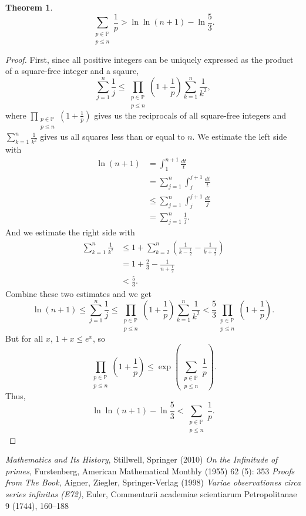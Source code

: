 \documentclass[a4paper]{article}
\newtheorem{theorem}{Theorem}[section]
\theoremstyle{definition}
\theoremstyle{remark}
\begin{document}
\begin{theorem}
  \[
  \sum_{\substack{p\in\mathbb{P}\\p\le n}}\frac{1}{p}>\ln\ln(n+1)-\ln\frac{5}{3}
  .
  \]
  \label{thm:sumReciprocalPrimeLnLn}
\end{theorem}
\begin{proof}
  First, since all positive integers can be uniquely expressed as the product of a square-free integer and a sqaure,
  \[
  \sum_{j=1}^n\frac{1}{j}\le\prod_{\substack{p\in\mathbb{P}\\p\le n}}\left( 1+\frac{1}{p} \right)\sum_{k=1}^n\frac{1}{k^2}
  ,
  \]
  where $\displaystyle\prod_{\substack{p\in\mathbb{P}\\p\le n}}\left( 1+\frac{1}{p} \right)$ gives us the reciprocals of all square-free integers and $\displaystyle\sum_{k=1}^n\frac{1}{k^2}$ gives us all squares less than or equal to $n$.
  We estimate the left side with
  \begin{align*}
    \ln(n+1)&=\int_1^{n+1}\frac{dt}{t}\\
    &=\sum_{j=1}^n\int_j^{j+1}\frac{dt}{t}\\
    &\le\sum_{j=1}^n\int_j^{j+1}\frac{dt}{j}\\
    &=\sum_{j=1}^n\frac{1}{j}
    .
  \end{align*}
  And we estimate the right side with
  \begin{align*}
    \sum_{k=1}^n\frac{1}{k^2}&\le1+\sum_{k=2}^n\left( \frac{1}{k-\frac{1}{2}}-\frac{1}{k+\frac{1}{2}} \right)\\
    &=1+\frac{2}{3}-\frac{1}{n+\frac{1}{2}}\\
    &<\frac{5}{3}
    .
  \end{align*}
  Combine these two estimates and we get
  \[
  \ln(n+1)\le\sum_{j=1}^n\frac{1}{j}\le\prod_{\substack{p\in\mathbb{P}\\p\le n}}\left( 1+\frac{1}{p} \right)\sum_{k=1}^n\frac{1}{k^2}<\frac{5}{3}\prod_{\substack{p\in\mathbb{P}\\p\le n}}\left( 1+\frac{1}{p} \right)
  .
  \]
  But for all $x$, $1+x\le e^{x}$, so
  \[
  \prod_{\substack{p\in\mathbb{P}\\p\le n}}\left( 1+\frac{1}{p} \right)\le \exp\left( \sum_{\substack{p\in\mathbb{P}\\p\le n}}\frac{1}{p} \right)
  .
  \]
  Thus, 
  \[
  \ln\ln(n+1)-\ln\frac{5}{3}<\sum_{\substack{p\in\mathbb{P}\\p\le n}}\frac{1}{p}
  .
  \]
\end{proof}

\begin{thebibliography}{12}
    \textit{Mathematics and Its History}, Stillwell, Springer (2010)
    \textit{On the Infinitude of primes}, Furstenberg, American Mathematical Monthly (1955) 62 (5): 353
    \textit{Proofs from The Book}, Aigner, Ziegler, Springer-Verlag (1998)
    \textit{Variae observationes circa series infinitas (E72)}, Euler, Commentarii academiae scientiarum
    Petropolitanae 9 (1744), 160–188
\end{thebibliography}
\end{document}

